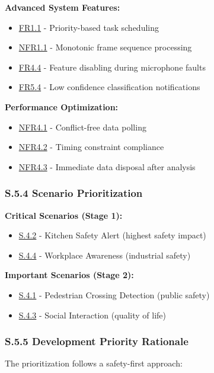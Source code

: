 \documentclass[12pt]{article}
\theoremstyle{definition}
\begin{document}
\textbf{Advanced System Features:}
\begin{itemize}
    \item \hyperref[FR1_1]{FR1.1} - Priority-based task scheduling
    \item \hyperref[NFR1_1]{NFR1.1} - Monotonic frame sequence processing
    \item \hyperref[FR4_4]{FR4.4} - Feature disabling during microphone faults
    \item \hyperref[FR5_4]{FR5.4} - Low confidence classification notifications
\end{itemize}

\textbf{Performance Optimization:}
\begin{itemize}
    \item \hyperref[NFR4_1]{NFR4.1} - Conflict-free data polling
    \item \hyperref[NFR4_2]{NFR4.2} - Timing constraint compliance
    \item \hyperref[NFR4_3]{NFR4.3} - Immediate data disposal after analysis
\end{itemize}

\subsubsection{S.5.4 Scenario Prioritization}

\textbf{Critical Scenarios (Stage 1):}
\begin{itemize}
    \item \hyperref[S.4.2]{S.4.2} - Kitchen Safety Alert (highest safety impact)
    \item \hyperref[S.4.4]{S.4.4} - Workplace Awareness (industrial safety)
\end{itemize}

\textbf{Important Scenarios (Stage 2):}
\begin{itemize}
    \item \hyperref[S.4.1]{S.4.1} - Pedestrian Crossing Detection (public
    safety)
    \item \hyperref[S.4.3]{S.4.3} - Social Interaction (quality of life)
\end{itemize}

\subsubsection{S.5.5 Development Priority Rationale}

The prioritization follows a safety-first approach:
\end{document}
